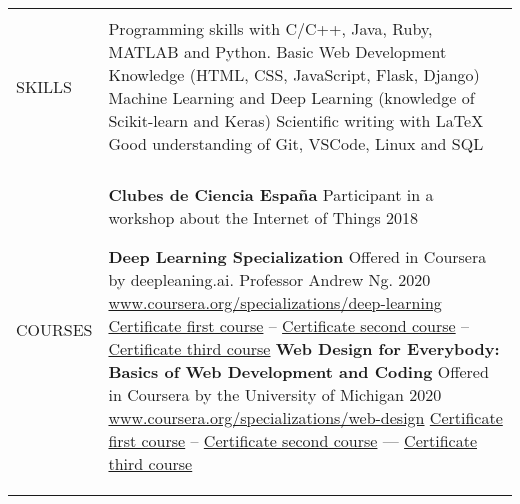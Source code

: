 \documentclass[letterpaper,10pt,oneside]{article}
\newcommand{\DatestampY}[1]{#1}
\newenvironment{body}
{\par\par
\begin{longtable}{p{0.125\textwidth}p{0.84\textwidth}}}
{\par\end{longtable}\par}
\renewcommand{\section}[3]{\\[-0.7cm]\pdfbookmark[2]{#2}{#3}\\%
\raggedleft  %
{\fontsize{9.5pt}{9.5pt}\selectfont\bfseries\raggedright%
\MakeUppercase{#1}}&}
\newcommand{\SmallEntryGap}{\par\vspace{0.38em}\par}
\begin{document}
\begin{body}
	
	
	
	\section{Skills}{Skills}{PDF:Skills}
	Programming skills with C/C++, Java, Ruby, MATLAB and Python. \newline
	Basic Web Development Knowledge (HTML, CSS, JavaScript, Flask, Django) \newline
	Machine Learning and Deep Learning (knowledge of Scikit-learn and Keras) \newline
	Scientific writing with {\LaTeX} \newline
	Good understanding of Git, VSCode, Linux and SQL
	
	\SmallEntryGap
	
	\section{Courses}{Courses}{PDF:Courses}
	
	\textbf{Clubes de Ciencia España} Participant in a workshop about the Internet of Things \hfill \DatestampY{2018}
	
	\textbf{Deep Learning Specialization} Offered in Coursera by deepleaning.ai. Professor Andrew Ng. \hfill \DatestampY{2020} \newline
	\href{https://www.coursera.org/specializations/deep-learning} {www.coursera.org/specializations/deep-learning} \newline \href{https://coursera.org/share/c36b607d339491c57250604518bbe799} {Certificate first course}  --
	\href{https://coursera.org/share/fe222b7353cb094de6b22e1e3e643737} {Certificate second course}  --
	\href{https://coursera.org/share/bd68f12f63ad303dbe4bc8e1736a4d2d} {Certificate third course} \newline
	\textbf{Web Design for Everybody: Basics of Web Development and Coding} \newline
	Offered in Coursera by the University of Michigan \hfill \DatestampY{2020} \newline
	\href{https://www.coursera.org/specializations/web-design} {www.coursera.org/specializations/web-design}\newline
	\href{https://coursera.org/share/e682bbf75a355fd21f8a3628cc47abd0}{Certificate first course} -- 
	\href{https://coursera.org/share/82d2da7ee39461481f5b9dd020cffe15}{Certificate second course} ---
	\href{https://coursera.org/share/38182e43ec72e328895d0d5df3d01b54}{Certificate third course}	\newline
	\SmallEntryGap

\end{body}
\end{document}

